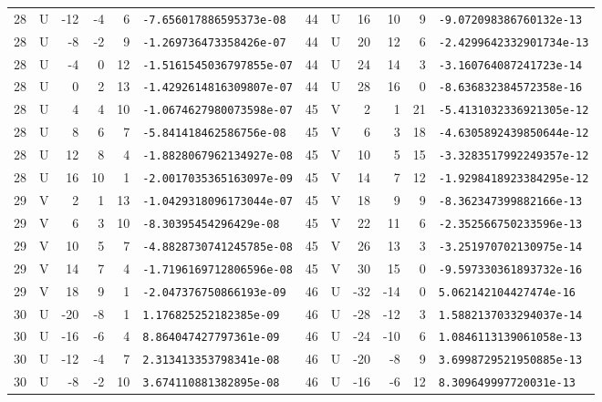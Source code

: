 \begin{longtable}{rcrrrl|rcrrrl}
28 & U & -12 & -4 & 6 & \texttt{-7.656017886595373e-08} & 44 & U & 16 & 10 & 9 & \texttt{-9.072098386760132e-13}\\
28 & U & -8 & -2 & 9 & \texttt{-1.269736473358426e-07} & 44 & U & 20 & 12 & 6 & \texttt{-2.4299642332901734e-13}\\
28 & U & -4 & 0 & 12 & \texttt{-1.5161545036797855e-07} & 44 & U & 24 & 14 & 3 & \texttt{-3.160764087241723e-14}\\
28 & U & 0 & 2 & 13 & \texttt{-1.4292614816309807e-07} & 44 & U & 28 & 16 & 0 & \texttt{-8.636832384572358e-16}\\
28 & U & 4 & 4 & 10 & \texttt{-1.0674627980073598e-07} & 45 & V & 2 & 1 & 21 & \texttt{-5.4131032336921305e-12}\\
28 & U & 8 & 6 & 7 & \texttt{-5.841418462586756e-08} & 45 & V & 6 & 3 & 18 & \texttt{-4.6305892439850644e-12}\\
28 & U & 12 & 8 & 4 & \texttt{-1.8828067962134927e-08} & 45 & V & 10 & 5 & 15 & \texttt{-3.3283517992249357e-12}\\
28 & U & 16 & 10 & 1 & \texttt{-2.0017035365163097e-09} & 45 & V & 14 & 7 & 12 & \texttt{-1.9298418923384295e-12}\\
29 & V & 2 & 1 & 13 & \texttt{-1.0429318096173044e-07} & 45 & V & 18 & 9 & 9 & \texttt{-8.362347399882166e-13}\\
29 & V & 6 & 3 & 10 & \texttt{-8.30395454296429e-08} & 45 & V & 22 & 11 & 6 & \texttt{-2.352566750233596e-13}\\
29 & V & 10 & 5 & 7 & \texttt{-4.8828730741245785e-08} & 45 & V & 26 & 13 & 3 & \texttt{-3.251970702130975e-14}\\
29 & V & 14 & 7 & 4 & \texttt{-1.7196169712806596e-08} & 45 & V & 30 & 15 & 0 & \texttt{-9.597330361893732e-16}\\
29 & V & 18 & 9 & 1 & \texttt{-2.047376750866193e-09} & 46 & U & -32 & -14 & 0 & \texttt{5.062142104427474e-16}\\
30 & U & -20 & -8 & 1 & \texttt{1.176825252182385e-09} & 46 & U & -28 & -12 & 3 & \texttt{1.5882137033294037e-14}\\
30 & U & -16 & -6 & 4 & \texttt{8.864047427797361e-09} & 46 & U & -24 & -10 & 6 & \texttt{1.0846113139061058e-13}\\
30 & U & -12 & -4 & 7 & \texttt{2.313413353798341e-08} & 46 & U & -20 & -8 & 9 & \texttt{3.6998729521950885e-13}\\
30 & U & -8 & -2 & 10 & \texttt{3.674110881382895e-08} & 46 & U & -16 & -6 & 12 & \texttt{8.309649997720031e-13}\\

\end{longtable}
